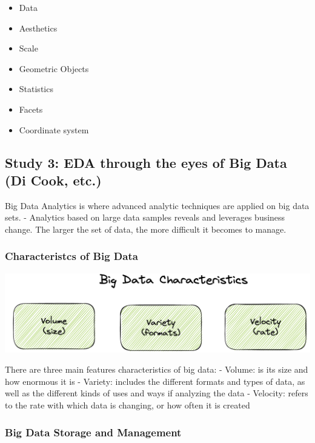 \documentclass[print]{nuthesis}
\providecommand{\tightlist}{%
  \setlength{\itemsep}{0pt}\setlength{\parskip}{0pt}}
\begin{document}
\begin{itemize}
\tightlist
\item
  Data
\item
  Aesthetics
\item
  Scale
\item
  Geometric Objects
\item
  Statistics
\item
  Facets
\item
  Coordinate system
\end{itemize}

\hypertarget{study-3-eda-through-the-eyes-of-big-data-di-cook-etc.}{%
\subsection{Study 3: EDA through the eyes of Big Data (Di Cook, etc.)}\label{study-3-eda-through-the-eyes-of-big-data-di-cook-etc.}}

Big Data Analytics is where advanced analytic techniques are applied on big data sets.
- Analytics based on large data samples reveals and leverages business change.
The larger the set of data, the more difficult it becomes to manage.

\hypertarget{characteristcs-of-big-data}{%
\subsubsection{Characteristcs of Big Data}\label{characteristcs-of-big-data}}

\includegraphics[width=\textwidth]{figure/BigDataDiagram}

There are three main features characteristics of big data:
- Volume: is its size and how enormous it is
- Variety: includes the different formats and types of data, as well as the different kinds of uses and ways if analyzing the data
- Velocity: refers to the rate with which data is changing, or how often it is created

\hypertarget{big-data-storage-and-management}{%
\subsubsection{Big Data Storage and Management}\label{big-data-storage-and-management}}
\end{document}
